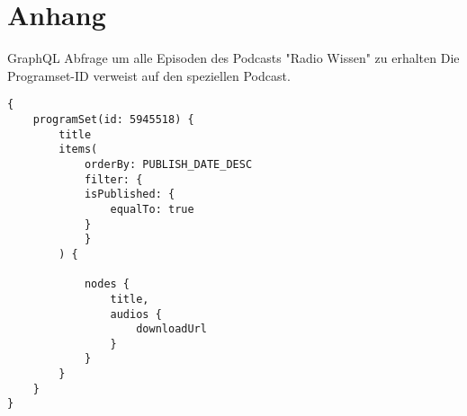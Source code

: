 \chapter{Anhang}\label{app:supplemental-information}

GraphQL Abfrage um alle Episoden des Podcasts "Radio Wissen" zu erhalten
Die Programset-ID verweist auf den speziellen Podcast.

\begin{verbatim}
{
    programSet(id: 5945518) {
        title
        items(
            orderBy: PUBLISH_DATE_DESC
            filter: {
            isPublished: {
                equalTo: true
            }
            }
        ) {
            
            nodes {
                title,
                audios {
                    downloadUrl
                }
            }
        }
    }
}

\end{verbatim}
